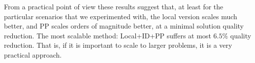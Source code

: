 \documentclass[letterpaper]{article} %
\def\
UrlFont{\rm}  %
\newcommand{\plan}[1]{\textbf{[\color{blue}PLAN:#1]}}
\newcommand{\commentout}[1]{}
\theoremstyle{definition}
\begin{document}
From a practical point of view these results suggest that, at least for the particular scenarios that we experimented with, the local version scales much better, and PP scales orders of magnitude better, at a minimal solution quality reduction. The most scalable method: Local+ID+PP suffers at most $6.5\%$ quality reduction. That is, if it is important to scale to larger problems, it is a very practical approach.



















\end{document}
